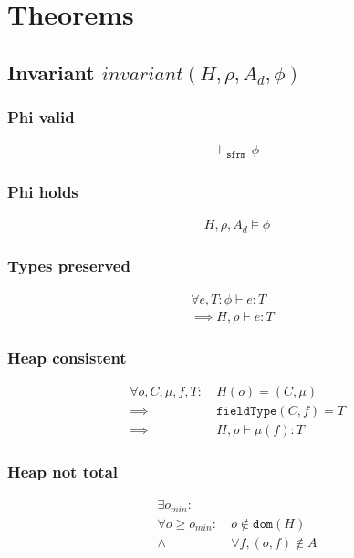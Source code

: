 \documentclass[11pt,a4paper]{article}
\newcommand{\sfrmphi}{\ensuremath{\vdash_\texttt{sfrm}}\,}
\newcommand{\evalphix}[4]{#1,#2,#3 \vDash #4}
\newcommand{\sType}[3]{#1 \vdash #2 : #3}
\newcommand{\dType}[4]{#1, #2 \vdash #3 : #4}
\begin{document}
\section{Theorems}
\subsection{Invariant $invariant(H, \rho, A_d, \phi)$}

\subsubsection{Phi valid}
\begin{align*}
    \sfrmphi {\phi}
\end{align*}

\subsubsection{Phi holds}
\begin{align*}
    \evalphix {H} {\rho} {A_d} {\phi}
\end{align*}

\subsubsection{Types preserved}
\begin{align*}
    \forall e, T : \sType {\phi} {e} {T}& \\
    \implies \dType {H} {\rho} {e} {T}&
\end{align*}

\subsubsection{Heap consistent}
\begin{align*}
\forall o, C, \mu, f, T :&~ 
H(o) = (C, \mu) \\
\implies&~ 
\texttt{fieldType}(C,f) = T \\
\implies&~
\dType {H} {\rho} {\mu(f)} {T}
\end{align*}

\subsubsection{Heap not total}
\begin{align*}
\exists o_{min} :&\\
\forall o \ge o_{min} :&~ o \not \in \texttt{dom}(H) \\
\wedge&~ \forall f, (o, f) \not \in A
\end{align*}
\end{document}
